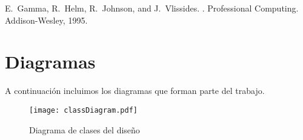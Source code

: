 \documentclass[10pt, a4paper,english,spanish]{article}
\begin{document}
\begin{thebibliography}{8}
\raggedright

	E.~Gamma, R.~Helm, R.~Johnson, and J.~Vlissides.
	.
	\newblock Professional Computing. Addison-Wesley, 1995.

\end{thebibliography}

\section{Diagramas}

A continuación incluimos los diagramas que forman parte del trabajo.

\begin{landscape}
	\begin{figure}[h]
		\caption{Diagrama de clases del diseño}
		\label{diag_diseno}
		\texttt{[image: classDiagram.pdf]}
	\end{figure} 
\end{landscape}
\end{document}
